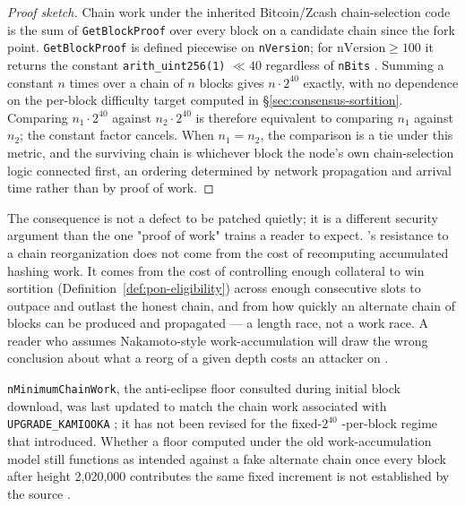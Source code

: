 \begin{proof}[Proof sketch]
Chain work under the inherited Bitcoin/Zcash chain-selection code is the sum of \texttt{GetBlockProof}
over every block on a candidate chain since the fork point. \texttt{GetBlockProof} is defined
piecewise on \texttt{nVersion}; for $\mathrm{nVersion} \ge 100$ it returns the constant
\texttt{arith\_uint256(1)} $\ll 40$ regardless of \texttt{nBits}
\shipped {}. Summing a constant $n$ times over a chain of $n$
\PoN blocks gives $n \cdot 2^{40}$ exactly, with no dependence on the per-block difficulty target
computed in \S\ref{sec:consensus-sortition}. Comparing $n_1 \cdot 2^{40}$ against $n_2 \cdot 2^{40}$ is
therefore equivalent to comparing $n_1$ against $n_2$; the constant factor cancels. When $n_1 = n_2$,
the comparison is a tie under this metric, and the surviving chain is whichever block the node's own
chain-selection logic connected first, an ordering determined by network propagation and arrival time
rather than by proof of work.
\end{proof}

The consequence is not a defect to be patched quietly; it is a different security argument than the
one "proof of work" trains a reader to expect. \PoN's resistance to a chain reorganization does not
come from the cost of recomputing accumulated hashing work. It comes from the cost of controlling
enough collateral to win sortition (Definition~\ref{def:pon-eligibility}) across enough consecutive
slots to outpace and outlast the honest chain, and from how quickly an alternate chain of blocks can be
produced and propagated — a length race, not a work race. A reader who assumes Nakamoto-style
work-accumulation will draw the wrong conclusion about what a reorg of a given depth costs an attacker
on \PoN.

\begin{remark}
\texttt{n\allowbreak{}Minimum\allowbreak{}Chain\allowbreak{}Work}, the anti-eclipse floor consulted during initial block download, was last
updated to match the chain work associated with \texttt{UPGRADE\_KAMIOOKA}
\shipped {}; it has not been revised for the fixed-$2^{40}$
-per-block regime that \PoN introduced. Whether a floor computed under the old work-accumulation model
still functions as intended against a fake alternate chain once every block after height
2{,}020{,}000 contributes the same fixed increment is not established by the source \srcinferred.
\end{remark}

